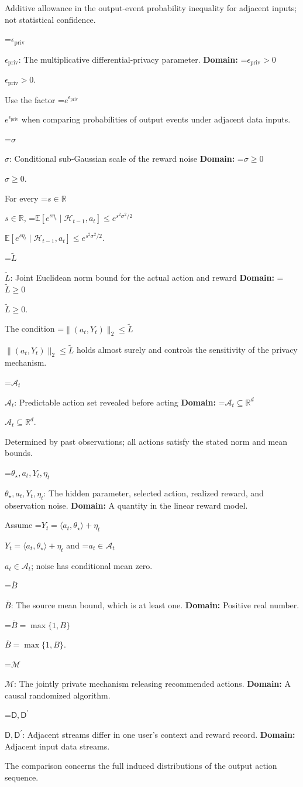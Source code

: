 \documentclass[10pt,a4paper]{article}
\newcommand{\AtlasMath}[1]{\par\begingroup\centering\setbox0=\hbox{$\displaystyle #1$}\ifdim\wd0>1.4\linewidth\typeout{ATLAS WIDE FORMULA: \the\wd0}\fi\ifdim\wd0>\linewidth\resizebox{\linewidth}{!}{\box0}\else\box0\fi\par\endgroup}
\newcommand{\AtlasInlineMath}[1]{\begingroup\setbox0=\hbox{$#1$}\ifdim\wd0>.4\linewidth\endgroup\AtlasMath{#1}\else\endgroup$#1$\fi}
\begin{document}
Additive allowance in the output-event probability inequality for adjacent inputs; not statistical confidence.

\AtlasInlineMath{\epsilon_{\mathrm{priv}}}: The multiplicative differential-privacy parameter. \textbf{Domain:} \AtlasInlineMath{\epsilon_{\mathrm{priv}}>0}.

Use the factor \AtlasInlineMath{e^{\epsilon_{\mathrm{priv}}}} when comparing probabilities of output events under adjacent data inputs.

\AtlasInlineMath{\sigma}: Conditional sub-Gaussian scale of the reward noise \textbf{Domain:} \AtlasInlineMath{\sigma\ge0}.

For every \AtlasInlineMath{s\in\mathbb R}, \AtlasInlineMath{\mathbb E[e^{s\eta_t}\mid\mathcal H_{t-1},a_t]\le e^{s^2\sigma^2/2}}.

\AtlasInlineMath{\widetilde L}: Joint Euclidean norm bound for the actual action and reward \textbf{Domain:} \AtlasInlineMath{\widetilde L\ge0}.

The condition \AtlasInlineMath{\|(a_t,Y_t)\|_2\le\widetilde L} holds almost surely and controls the sensitivity of the privacy mechanism.

\AtlasInlineMath{\mathcal A_t}: Predictable action set revealed before acting \textbf{Domain:} \AtlasInlineMath{\mathcal A_t\subseteq\mathbb R^d}.

Determined by past observations; all actions satisfy the stated norm and mean bounds.

\AtlasInlineMath{\theta_\star,a_t,Y_t,\eta_t}: The hidden parameter, selected action, realized reward, and observation noise. \textbf{Domain:} A quantity in the linear reward model.

Assume \AtlasInlineMath{Y_t=\langle a_t,\theta_\star\rangle+\eta_t} and \AtlasInlineMath{a_t\in\mathcal A_t}; noise has conditional mean zero.

\AtlasInlineMath{\overline B}: The source mean bound, which is at least one. \textbf{Domain:} Positive real number.

\AtlasInlineMath{\overline B=\max\{1,B\}}.

\AtlasInlineMath{\mathcal M}: The jointly private mechanism releasing recommended actions. \textbf{Domain:} A causal randomized algorithm.

\AtlasInlineMath{\mathsf D,\mathsf D^{\prime}}: Adjacent streams differ in one user’s context and reward record. \textbf{Domain:} Adjacent input data streams.

The comparison concerns the full induced distributions of the output action sequence.
\end{document}
